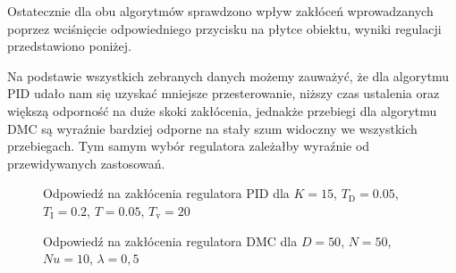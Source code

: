 Ostatecznie dla obu algorytmów sprawdzono wpływ zakłóceń wprowadzanych poprzez wciśnięcie odpowiedniego przycisku na płytce obiektu, wyniki regulacji przedstawiono poniżej.

Na podstawie wszystkich zebranych danych możemy zauważyć, że dla algorytmu PID udało nam się uzyskać mniejsze przesterowanie, niższy czas ustalenia oraz większą odporność na duże skoki zakłócenia, jednakże przebiegi dla algorytmu DMC są wyraźnie bardziej odporne na stały szum widoczny we wszystkich przebiegach. Tym samym wybór regulatora zależałby wyraźnie od przewidywanych zastosowań.

\begin{figure}[H]
\centering

\caption{Odpowiedź na zakłócenia regulatora PID dla $K = 15$, $T_\mathrm{D} = 0.05$, $T_\mathrm{I} = 0.2$, $T = 0.05$, $T_\mathrm{v} = 20$}
\label{PIDbest}
\end{figure}

\begin{figure}[H]
\centering

\caption{Odpowiedź na zakłócenia regulatora DMC dla $ D = 50 $, $  N = 50 $, $ Nu = 10 $, $ \lambda = 0,5 $}
\label{DMCbest}
\end{figure}

